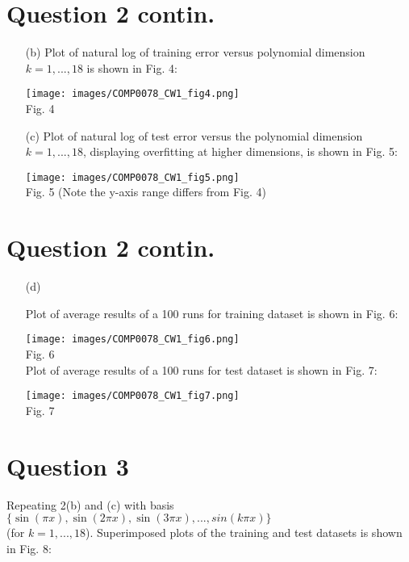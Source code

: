 \documentclass[a4paper,12pt]{article}
\begin{document}
\section*{Question 2 contin.}

\begin{enumerate}
\item[(b)]
Plot of natural log of training error versus polynomial dimension $k = 1, . . . , 18$ is shown in Fig. 4:

\texttt{[image: images/COMP0078\_CW1\_fig4.png]}\\
Fig. 4 \\

\item[(c)]
Plot of natural log of test error versus the polynomial dimension $k = 1, . . . , 18$, displaying overfitting at higher dimensions, is shown in Fig. 5:

\texttt{[image: images/COMP0078\_CW1\_fig5.png]}\\
Fig. 5 (Note the y-axis range differs from Fig. 4)\\

\end{enumerate}
\clearpage

\section*{Question 2 contin.}

\begin{enumerate}

\item[(d)]

Plot of average results of a 100 runs for training dataset is shown in Fig. 6:

\texttt{[image: images/COMP0078\_CW1\_fig6.png]}\\
Fig. 6 \\

Plot of average results of a 100 runs for test dataset is shown in Fig. 7:

\texttt{[image: images/COMP0078\_CW1\_fig7.png]}\\
Fig. 7 \\

\end{enumerate}
\clearpage
\section*{Question 3}
Repeating 2(b) and (c) with basis $\{\sin(\pi x), \sin(2\pi x), \sin(3\pi x), . . . , sin(k\pi x)\}$ \\ (for $k = 1,...,18$). Superimposed plots of the training and test datasets is shown in Fig. 8:
\end{document}
